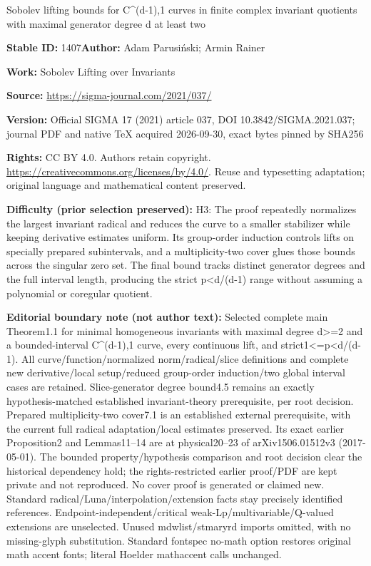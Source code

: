 \documentclass[11pt]{article}
\numberwithin{equation}{section}
\numberwithin{equation}{section}
\begin{document}
\begin{center}\Large Sobolev lifting bounds for C\textasciicircum{}(d-1),1 curves in finite complex invariant quotients with maximal generator degree d at least two\end{center}
\noindent\textbf{Stable ID:} 1407\quad\textbf{Author:} Adam Parusiński; Armin Rainer\par
\noindent\textbf{Work:} Sobolev Lifting over Invariants\par
\noindent\textbf{Source:} \url{https://sigma-journal.com/2021/037/}\par
\noindent\textbf{Version:} Official SIGMA 17 (2021) article 037, DOI 10.3842/SIGMA.2021.037; journal PDF and native TeX acquired 2026-09-30, exact bytes pinned by SHA256\par
\noindent\textbf{Rights:} CC BY 4.0. Authors retain copyright. \url{https://creativecommons.org/licenses/by/4.0/}. Reuse and typesetting adaptation; original language and mathematical content preserved.\par
\noindent\textbf{Difficulty (prior selection preserved):} {\CJKfont H3: The proof repeatedly normalizes the largest invariant radical and reduces the curve to a smaller stabilizer while keeping derivative estimates uniform. Its group-order induction controls lifts on specially prepared subintervals, and a multiplicity-two cover glues those bounds across the singular zero set. The final bound tracks distinct generator degrees and the full interval length, producing the strict p<d/(d-1) range without assuming a polynomial or coregular quotient.}\par
\medskip\noindent\textbf{Editorial boundary note (not author text):} Selected complete main Theorem1.1 for minimal homogeneous invariants with maximal degree d>=2 and a bounded-interval C\textasciicircum{}(d-1),1 curve, every continuous lift, and strict1<=p<d/(d-1). All curve/function/normalized norm/radical/slice definitions and complete new derivative/local setup/reduced group-order induction/two global interval cases are retained. Slice-generator degree bound4.5 remains an exactly hypothesis-matched established invariant-theory prerequisite, per root decision. Prepared multiplicity-two cover7.1 is an established external prerequisite, with the current full radical adaptation/local estimates preserved. Its exact earlier Proposition2 and Lemmas11–14 are at physical20–23 of arXiv1506.01512v3 (2017-05-01). The bounded property/hypothesis comparison and root decision clear the historical dependency hold; the rights-restricted earlier proof/PDF are kept private and not reproduced. No cover proof is generated or claimed new. Standard radical/Luna/interpolation/extension facts stay precisely identified references. Endpoint-independent/critical weak-Lp/multivariable/Q-valued extensions are unselected. Unused mdwlist/stmaryrd imports omitted, with no missing-glyph substitution. Standard fontspec no-math option restores original math accent fonts; literal Hoelder mathaccent calls unchanged.\par
\end{document}
